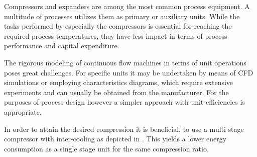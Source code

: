         Compressors and expanders are among the most common process equipment. A multitude of processes
        utilizes them as primary or auxiliary units. While the tasks performed by especially the compressors
        is essential for reaching the required process temperatures, they have less impact in terms of
        process performance and capital expenditure.

        The rigorous modeling of continuous flow machines in terms of unit operations poses great challenges.
        For specific units it may be undertaken by means of CFD simulations or employing characteristics diagrams,
        which require extensive experiments and can usually be obtained from the manufacturer.
        For the purposes of process design however a simpler approach with unit efficiencies is appropriate.

        In order to attain the desired compression it is beneficial, to use a multi stage compressor with
        inter-cooling as depicted in . This yields a lower energy consumption
        as a single stage unit for the same compression ratio.


%
%
%

